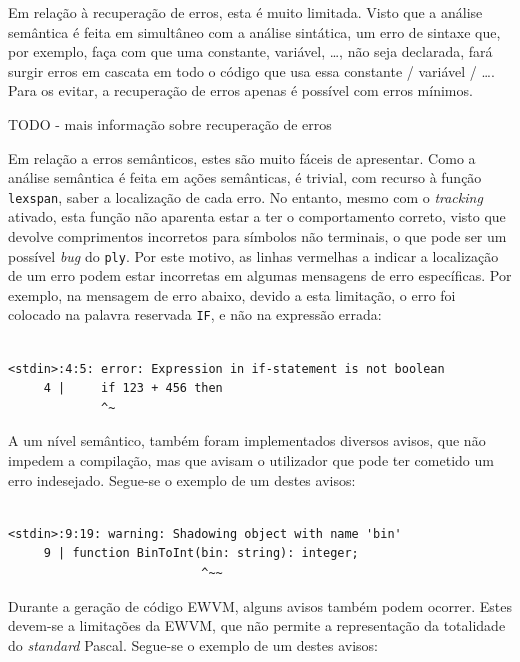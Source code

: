 \documentclass[12pt, a4paper]{article}
\begin{document}
Em relação à recuperação de erros, esta é muito limitada. Visto que a análise semântica é feita em
simultâneo com a análise sintática, um erro de sintaxe que, por exemplo, faça com que uma constante,
variável, \ldots, não seja declarada, fará surgir erros em cascata em todo o código que usa essa
constante / variável / \ldots. Para os evitar, a recuperação de erros apenas é possível com erros
mínimos.

{\color{red} TODO - mais informação sobre recuperação de erros}

Em relação a erros semânticos, estes são muito fáceis de apresentar. Como a análise semântica é
feita em ações semânticas, é trivial, com recurso à função \texttt{lexspan}, saber a localização de
cada erro. No entanto, mesmo com o \emph{tracking} ativado, esta função não aparenta estar a ter o
comportamento correto, visto que devolve comprimentos incorretos para símbolos não terminais, o que
pode ser um possível \emph{bug} do \texttt{ply}. Por este motivo, as linhas vermelhas a indicar a
localização de um erro podem estar incorretas em algumas mensagens de erro específicas. Por exemplo,
na mensagem de erro abaixo, devido a esta limitação, o erro foi colocado na palavra reservada
\texttt{IF}, e não na expressão errada:

\begin{lstlisting}

<stdin>:4:5: error: Expression in if-statement is not boolean
     4 |     if 123 + 456 then
             ^~
\end{lstlisting}

A um nível semântico, também foram implementados diversos avisos, que não impedem a compilação, mas
que avisam o utilizador que pode ter cometido um erro indesejado. Segue-se o exemplo de um destes
avisos:


\begin{lstlisting}

<stdin>:9:19: warning: Shadowing object with name 'bin'
     9 | function BinToInt(bin: string): integer;
                           ^~~
\end{lstlisting}

Durante a geração de código EWVM, alguns avisos também podem ocorrer. Estes devem-se a limitações da
EWVM, que não permite a representação da totalidade do \emph{standard} Pascal. Segue-se o exemplo de
um destes avisos:
\end{document}
